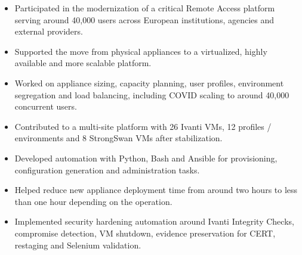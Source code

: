 \begin{itemize}
  \item Participated in the modernization of a critical Remote Access platform serving around 40,000 users across European institutions, agencies and external providers.
  \item Supported the move from physical appliances to a virtualized, highly available and more scalable platform.
  \item Worked on appliance sizing, capacity planning, user profiles, environment segregation and load balancing, including COVID scaling to around 40,000 concurrent users.
  \item Contributed to a multi-site platform with 26 Ivanti VMs, 12 profiles / environments and 8 StrongSwan VMs after stabilization.
  \item Developed automation with Python, Bash and Ansible for provisioning, configuration generation and administration tasks.
  \item Helped reduce new appliance deployment time from around two hours to less than one hour depending on the operation.
  \item Implemented security hardening automation around Ivanti Integrity Checks, compromise detection, VM shutdown, evidence preservation for CERT, restaging and Selenium validation.
\end{itemize}
